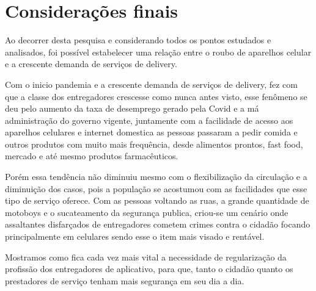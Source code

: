 \section{Considerações finais}

    Ao decorrer desta pesquisa e considerando todos os pontos estudados e analisados,
    foi possível estabelecer uma relação entre o roubo de aparelhos celular e a
    crescente demanda de serviços de delivery. 

    Com o inicio pandemia e a crescente demanda de serviços de delivery, 
    fez com que a classe dos entregadores crescesse como nunca antes visto, 
    esse fenômeno se deu pelo aumento da taxa de desemprego gerado pela Covid e a má 
    administração do governo vigente, juntamente com a facilidade de acesso aos 
    aparelhos celulares e internet domestica as pessoas passaram a pedir comida 
    e outros produtos com muito mais frequência, desde alimentos prontos, fast 
    food, mercado e até mesmo produtos farmacêuticos.

    Porém essa tendência não diminuiu mesmo com o flexibilização da circulação 
    e a diminuição dos casos, pois a população se acostumou com as facilidades 
    que esse tipo de serviço oferece. Com as pessoas voltando as ruas, a grande 
    quantidade de motoboys e o sucateamento da segurança publica, criou-se um cenário
    onde assaltantes disfarçados de entregadores cometem crimes contra o cidadão 
    focando principalmente em celulares sendo esse o item mais visado e rentável.

    Mostramos como fica cada vez mais vital a necessidade de regularização
    da profissão dos entregadores de aplicativo, para que, tanto o cidadão
    quanto os prestadores de serviço tenham mais segurança em seu dia a dia.

\postextual